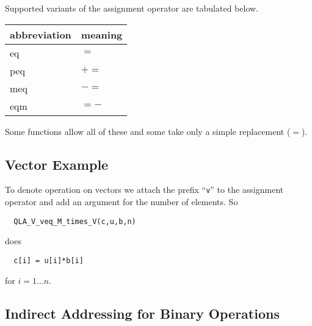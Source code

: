 \documentclass{article}
\begin{document}
Supported variants of the assignment operator are tabulated below.
\begin{center}
\begin{tabular}{|l|l|}
\hline
 abbreviation & meaning \\
\hline
 eq   & $=$  \\
 peq  & $+=$ \\
 meq  & $-=$ \\
 eqm  & $=-$ \\
\hline
\end{tabular}
\end{center}

Some functions allow all of these and some take only a simple
replacement ($=$).

\subsection{Vector Example}

To denote operation on vectors we attach the prefix ``{\tt v}'' to the
assignment operator and add an argument for the number of elements.
So
%
\begin{verbatim}
  QLA_V_veq_M_times_V(c,u,b,n)
\end{verbatim}
%
does
%
\begin{verbatim}
  c[i] = u[i]*b[i]
\end{verbatim}
%
for $i = 1\ldots{}n$.

\subsection{Indirect Addressing for Binary Operations}
\end{document}
